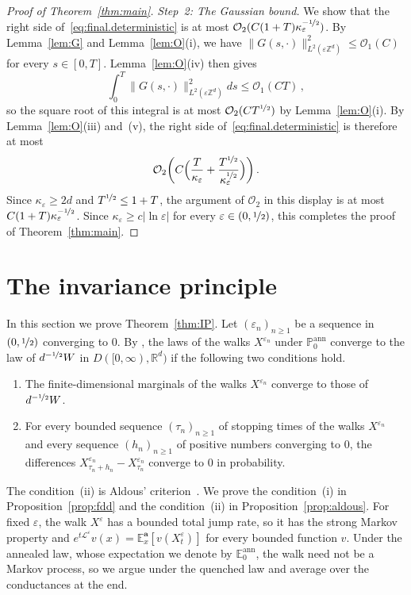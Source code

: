 \documentclass[11pt]{amsart}
\numberwithin{equation}{section}
\newcommand{\Z}{\mathbb{Z}}
\newcommand{\R}{\mathbb{R}}
\newcommand{\E}{\mathbb{E}}
\newcommand{\PP}{\mathbb{P}}
\newcommand{\ba}{\mathbf{a}}
\newcommand{\cO}{\mathcal{O}}
\newcommand{\eps}{\varepsilon}
\newcommand{\Leps}{\mathcal{L}^\varepsilon}
\newcommand{\nf}{\nicefrac}
\begin{document}
\begin{proof}[Proof of Theorem~\ref{thm:main}]
\smallskip

\emph{Step~2: The Gaussian bound.}
We show that the right side of~\eqref{eq:final.deterministic} is at most $\cO_2(C (1 + T) \kappa_\eps^{-\nf12})$.
By Lemma~\ref{lem:G} and Lemma~\ref{lem:O}(i), we have $\|G(s, \cdot)\|_{L^2(\eps \Z^d)}^2 \leq \cO_1(C)$ for every $s \in [0, T]$.
Lemma~\ref{lem:O}(iv) then gives
\begin{equation*}
    \int_0^T \|G(s, \cdot)\|_{L^2(\eps \Z^d)}^2 ds \leq \cO_1(C T)\,,
\end{equation*}
so the square root of this integral is at most $\cO_2(C T^{\nf12})$ by Lemma~\ref{lem:O}(i).
By Lemma~\ref{lem:O}(iii) and~(v), the right side of~\eqref{eq:final.deterministic} is therefore at most
\begin{equation*}
    \cO_2 \biggl( C \Bigl( \frac{T}{\kappa_\eps} + \frac{T^{\nf12}}{\kappa_\eps^{\nf12}} \Bigr) \biggr)\,.
\end{equation*}
Since $\kappa_\eps \geq 2d$ and $T^{\nf12} \leq 1 + T$, the argument of $\cO_2$ in this display is at most $C (1 + T) \kappa_\eps^{-\nf12}$.
Since $\kappa_\eps \geq c |\ln \eps|$ for every $\eps \in (0, \nf12)$, this completes the proof of Theorem~\ref{thm:main}.
\end{proof}

\section{The invariance principle} \label{sec:IP}

In this section we prove Theorem~\ref{thm:IP}.
Let $(\eps_n)_{n \geq 1}$ be a sequence in $(0, \nf12)$ converging to $0$.
By \citet[Theorems~14.10 and~14.11]{Kallenberg2002}, the laws of the walks $X^{\eps_n}$ under $\PP^{\mathrm{ann}}_0$ converge to the law of $d^{-\nf12} W$ in $D([0, \infty), \R^d)$ if the following two conditions hold.
\begin{enumerate}
    \item[\textup{(i)}] The finite-dimensional marginals of the walks $X^{\eps_n}$ converge to those of $d^{-\nf12} W$.
    \item[\textup{(ii)}] For every bounded sequence $(\tau_n)_{n \geq 1}$ of stopping times of the walks $X^{\eps_n}$ and every sequence $(h_n)_{n \geq 1}$ of positive numbers converging to $0$, the differences $X^{\eps_n}_{\tau_n + h_n} - X^{\eps_n}_{\tau_n}$ converge to $0$ in probability.
\end{enumerate}
The condition~(ii) is Aldous' criterion~\citep{Aldous1978}.
We prove the condition~(i) in Proposition~\ref{prop:fdd} and the condition~(ii) in Proposition~\ref{prop:aldous}.
For fixed $\eps$, the walk $X^\eps$ has a bounded total jump rate, so it has the strong Markov property and $e^{t \Leps} v(x) = \E^\ba_x[v(X^\eps_t)]$ for every bounded function $v$.
Under the annealed law, whose expectation we denote by $\E^{\mathrm{ann}}_0$, the walk need not be a Markov process, so we argue under the quenched law and average over the conductances at the end.
\end{document}
